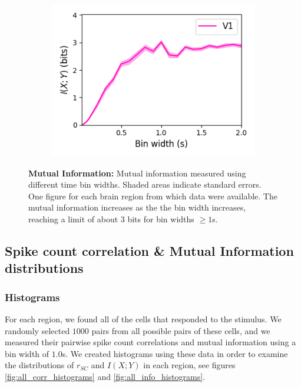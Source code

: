 \documentclass[a4paper,12pt]{article}
\theoremstyle{definition}
\begin{document}
\begin{figure}[p]
\begin{subfigure}{0.5\textwidth}
    \includegraphics[width=\textwidth]{figures/linear_mutual_info_by_bin_width_v1_6.png}
  \end{subfigure}
  \caption{\textbf{Mutual Information:} Mutual information measured using different time bin widths. Shaded areas indicate standard errors. One figure for each brain region from which data were available. The mutual information increases as the the bin width increases, reaching a limit of about $3$ bits for bin widths $\geq 1$s.}
  \label{fig:linear_bin_width_vs_mutual_information_by_region}
\end{figure}

\subsection{Spike count correlation \& Mutual Information distributions}

\subsubsection{Histograms}
For each region, we found all of the cells that responded to the stimulus. We randomly selected $1000$ pairs from all possible pairs of these cells, and we measured their pairwise  spike count correlations and mutual information using a bin width of $1.0$s. We created histograms using these data in order to examine the distributions of $r_{SC}$ and $I(X;Y)$ in each region, see figures \ref{fig:all_corr_histograms} and \ref{fig:all_info_histograms}.
\end{document}
